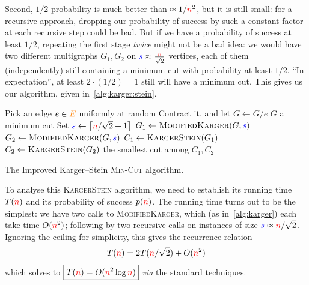 Second, $1/2$ probability is much better than $\approx 1/{\textcolor{red}{n}}^2$, but it is still small: for a recursive approach, dropping our probability of success by such a constant factor at each recursive step could be bad. But if we have a probability of success at least $1/2$, repeating the first stage \emph{twice} might not be a bad idea: we would have two different multigraphs $G_1,G_2$ on $\textcolor{blue}{s} \approx \frac{{\textcolor{red}{n}}}{\sqrt{2}}$ vertices, each of them (independently) still containing a minimum cut with probability at least $1/2$. ``In expectation'', at least $2\cdot (1/2)=1$ still will have a minimum cut. This gives us our algorithm, given in~\cref{alg:karger:stein}.
\begin{algorithm}[htbp!]
\begin{algorithmic}[1]
        \State Pick an edge $e\in\textcolor{orange}{E}$ uniformly at random
        \State Contract it, and let $G \gets G/e$
    \EndWhile
    \State\Return $G$
\EndProcedure
{}
        \State \Return a minimum cut 
    \EndIf
    \State Set $\textcolor{blue}{s} \gets \left\lceil {{\textcolor{red}{n}}}/{\sqrt{2}}+1 \right\rceil$
    \BeginFirstStage
        \State $G_1 \gets \textsc{ModifiedKarger}(G,\textcolor{blue}{s})$
        \State $G_2 \gets \textsc{ModifiedKarger}(G,\textcolor{blue}{s})$
    \EndFirstStage
    \BeginSecondStage
        \State $C_1 \gets \textsc{KargerStein}(G_1)$
        \State $C_2 \gets \textsc{KargerStein}(G_2)$
    \EndSecondStage
    \State\label{alg:karger:stein:return}\Return the smallest cut among $C_1,C_2$
\EndProcedure
\end{algorithmic}
\caption{The Improved Karger--Stein \textsc{Min-Cut} algorithm.}
\label{alg:karger:stein}
\end{algorithm}
To analyse this \textsc{KargerStein} algorithm, we need to establish its running time $T({\textcolor{red}{n}})$ and its probability of success $p({\textcolor{red}{n}})$. The running time turns out to be the simplest: we have two calls to \textsc{ModifiedKarger}, which (as in~\cref{alg:karger}) each take time $O({\textcolor{red}{n}}^2)$; following by two recursive calls on instances of size $\textcolor{blue}{s}\approx {\textcolor{red}{n}}/\sqrt{2}$. Ignoring the ceiling for simplicity, this gives the recurrence relation
\begin{equation}
    T({\textcolor{red}{n}}) = 2T({\textcolor{red}{n}}/\sqrt{2})+O({\textcolor{red}{n}}^2)
\end{equation}
which solves to $\boxed{T({\textcolor{red}{n}})=O({\textcolor{red}{n}}^2\log{\textcolor{red}{n}})}$ \emph{via} the standard techniques.\medskip

